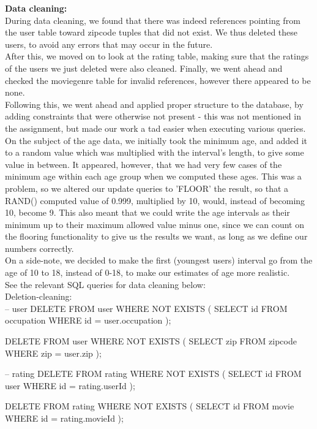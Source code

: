 \textbf{Data cleaning:} \\
During data cleaning, we found that there was indeed references pointing from the user table toward zipcode tuples that did not exist. We thus deleted these users, to avoid any errors that may occur in the future. \\
After this, we moved on to look at the rating table, making sure that the ratings of the users we just deleted were also cleaned. Finally, we went ahead and checked the moviegenre table for invalid references, however there appeared to be none. \\
Following this, we went ahead and applied proper structure to the database, by adding constraints that were otherwise not present - this was not mentioned in the assignment, but made our work a tad easier when executing various queries. \\
On the subject of the age data, we initially took the minimum age, and added it to a random value which was multiplied with the interval's length, to give some value in between. It appeared, however, that we had very few cases of the minimum age within each age group when we computed these ages. This was a problem, so we altered our update queries to 'FLOOR' the result, so that a RAND() computed value of 0.999, multiplied by 10, would, instead of becoming 10, become 9. This also meant that we could write the age intervals as their minimum up to their maximum allowed value minus one, since we can count on the flooring functionality to give us the results we want, as long as we define our numbers correctly. \\
On a side-note, we decided to make the first (youngest users) interval go from the age of 10 to 18, instead of 0-18, to make our estimates of age more realistic. \\
See the relevant SQL queries for data cleaning below: \\

Deletion-cleaning:\\
-- user
DELETE FROM user
WHERE NOT EXISTS (
	SELECT id FROM occupation
	WHERE id = user.occupation
);

DELETE FROM user
WHERE NOT EXISTS (
	SELECT zip FROM zipcode
	WHERE zip = user.zip
);

-- rating
DELETE FROM rating
WHERE NOT EXISTS (
	SELECT id FROM user
	WHERE id = rating.userId
);

DELETE FROM rating
WHERE NOT EXISTS (
	SELECT id FROM movie
	WHERE id = rating.movieId
);

